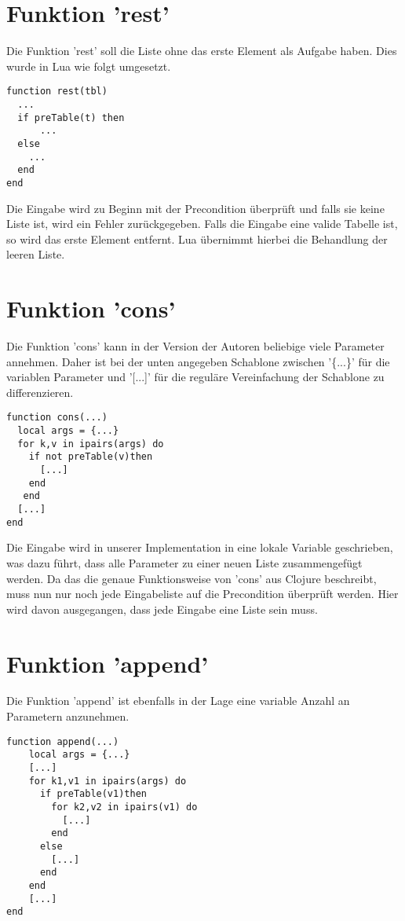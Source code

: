 \section{Funktion 'rest'}
Die Funktion 'rest' soll die Liste ohne das erste Element als Aufgabe haben. Dies wurde in Lua wie folgt umgesetzt.

\begin{lstlisting}
function rest(tbl)
  ...
  if preTable(t) then
      ...
  else
    ...
  end
end
\end{lstlisting}

Die Eingabe wird zu Beginn mit der Precondition überprüft und falls sie keine Liste ist, wird ein Fehler zurückgegeben. Falls die Eingabe eine valide Tabelle ist, so wird das erste Element entfernt. Lua übernimmt hierbei die Behandlung der leeren Liste.


\section{Funktion 'cons'}
Die Funktion 'cons' kann in der Version der Autoren beliebige viele Parameter annehmen. Daher ist bei der unten angegeben Schablone zwischen '\{...\}' für die variablen Parameter und '[...]' für die reguläre Vereinfachung der Schablone zu differenzieren.

\begin{lstlisting}
function cons(...)
  local args = {...}
  for k,v in ipairs(args) do
    if not preTable(v)then
      [...]
    end
   end
  [...]
end
\end{lstlisting}

Die Eingabe wird in unserer Implementation in eine lokale Variable geschrieben, was dazu führt, dass alle Parameter zu einer neuen Liste zusammengefügt werden. Da das die genaue Funktionsweise von 'cons' aus Clojure beschreibt, muss nun nur noch jede Eingabeliste auf die Precondition überprüft werden. Hier wird davon ausgegangen, dass jede Eingabe eine Liste sein muss.

\section{Funktion 'append'}
Die Funktion 'append' ist ebenfalls in der Lage eine variable Anzahl an Parametern anzunehmen.

\begin{lstlisting}
function append(...)
    local args = {...}
    [...]
    for k1,v1 in ipairs(args) do
      if preTable(v1)then
        for k2,v2 in ipairs(v1) do 
          [...]
        end
      else
        [...]
      end
    end
    [...]
end
\end{lstlisting}

